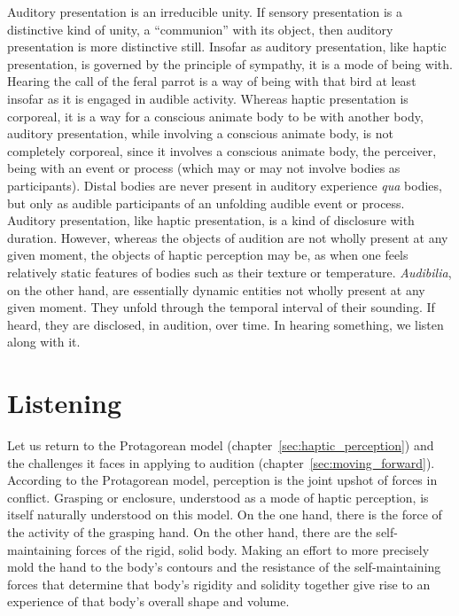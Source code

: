 Auditory presentation is an irreducible unity. If sensory presentation is a distinctive kind of unity, a ``communion'' with its object, then auditory presentation is more distinctive still. Insofar as auditory presentation, like haptic presentation, is governed by the principle of sympathy, it is a mode of being with. Hearing the call of the feral parrot is a way of being with that bird at least insofar as it is engaged in audible activity. Whereas haptic presentation is corporeal, it is a way for a conscious animate body to be with another body, auditory presentation, while involving a conscious animate body, is not completely corporeal, since it involves a conscious animate body, the perceiver, being with an event or process (which may or may not involve bodies as participants). Distal bodies are never present in auditory experience \emph{qua} bodies, but only as audible participants of an unfolding audible event or process. Auditory presentation, like haptic presentation, is a kind of disclosure with duration. However, whereas the objects of audition are not wholly present at any given moment, the objects of haptic perception may be, as when one feels relatively static features of bodies such as their texture or temperature. \emph{Audibilia}, on the other hand, are essentially dynamic entities not wholly present at any given moment. They unfold through the temporal interval of their sounding. If heard, they are disclosed, in audition, over time. In hearing something, we listen along with it.


\section{Listening} %
\label{sec:listening}

Let us return to the Protagorean model (chapter~\ref{sec:haptic_perception}) and the challenges it faces in applying to audition (chapter~\ref{sec:moving_forward}). According to the Protagorean model, perception is the joint upshot of forces in conflict. Grasping or enclosure, understood as a mode of haptic perception, is itself naturally understood on this model. On the one hand, there is the force of the activity of the grasping hand. On the other hand, there are the self-maintaining forces of the rigid, solid body. Making an effort to more precisely mold the hand to the body's contours and the resistance of the self-maintaining forces that determine that body's rigidity and solidity together give rise to an experience of that body's overall shape and volume. 

